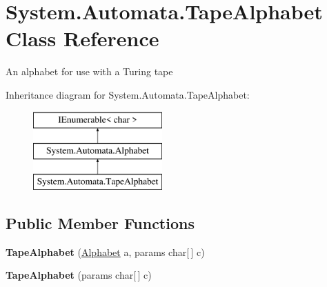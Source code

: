 \hypertarget{class_system_1_1_automata_1_1_tape_alphabet}{}\section{System.\+Automata.\+Tape\+Alphabet Class Reference}
\label{class_system_1_1_automata_1_1_tape_alphabet}


An alphabet for use with a Turing tape  


Inheritance diagram for System.\+Automata.\+Tape\+Alphabet\+:\begin{figure}[H]
\begin{center}
\leavevmode
\includegraphics[height=3.000000cm]{class_system_1_1_automata_1_1_tape_alphabet}
\end{center}
\end{figure}
\subsection*{Public Member Functions}
\begin{DoxyCompactItemize}
\item 
\mbox{\label{class_system_1_1_automata_1_1_tape_alphabet_ab22c5bbbc8ffa821c4e3dbfadb105b48}} 
{\bfseries Tape\+Alphabet} (\mbox{\hyperlink{class_system_1_1_automata_1_1_alphabet}{Alphabet}} a, params char\mbox{[}$\,$\mbox{]} c)
\item 
\mbox{\label{class_system_1_1_automata_1_1_tape_alphabet_a527ad315771a4fce4b3f5fd349d4ad6a}} 
{\bfseries Tape\+Alphabet} (params char\mbox{[}$\,$\mbox{]} c)
\end{DoxyCompactItemize}

